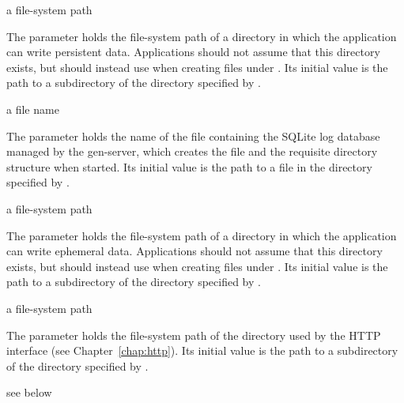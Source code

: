 \begin{parameter}
\end{parameter}
\hasvalue{} a file-system path

The  parameter holds the file-system path of a directory
in which the application can write persistent data.
Applications should not assume that this directory exists, but should
instead use  when creating files under .
Its initial value is the path to a  subdirectory of
the directory specified by .

\begin{parameter}
\end{parameter}
\hasvalue{} a file name

The  parameter holds the name of the file containing the SQLite
log database managed by the  gen-server, which creates the file
and the requisite directory structure when started.
Its initial value is the path to a  file in the directory
specified by .

\begin{parameter}
\end{parameter}
\hasvalue{} a file-system path

The  parameter holds the file-system path of a directory
in which the application can write ephemeral data.
Applications should not assume that this directory exists, but should
instead use  when creating files under .
Its initial value is the path to a  subdirectory of
the directory specified by .

\begin{parameter}
\end{parameter}
\hasvalue{} a file-system path

The  parameter holds the file-system path of the directory
used by the HTTP interface (see Chapter~\ref{chap:http}).
Its initial value is the path to a  subdirectory of
the directory specified by .

\begin{syntax}
\end{syntax}
\returns{} see below

